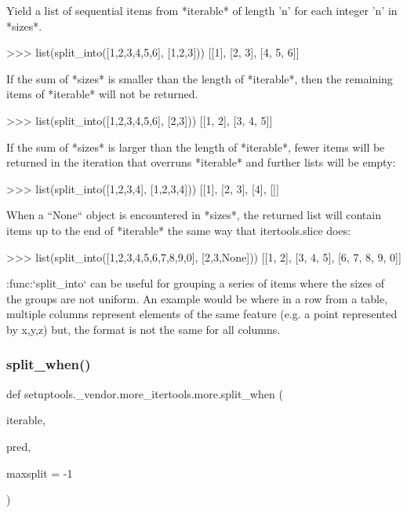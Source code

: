 \begin{DoxyVerb}Yield a list of sequential items from *iterable* of length 'n' for each
integer 'n' in *sizes*.

    >>> list(split_into([1,2,3,4,5,6], [1,2,3]))
    [[1], [2, 3], [4, 5, 6]]

If the sum of *sizes* is smaller than the length of *iterable*, then the
remaining items of *iterable* will not be returned.

    >>> list(split_into([1,2,3,4,5,6], [2,3]))
    [[1, 2], [3, 4, 5]]

If the sum of *sizes* is larger than the length of *iterable*, fewer items
will be returned in the iteration that overruns *iterable* and further
lists will be empty:

    >>> list(split_into([1,2,3,4], [1,2,3,4]))
    [[1], [2, 3], [4], []]

When a ``None`` object is encountered in *sizes*, the returned list will
contain items up to the end of *iterable* the same way that itertools.slice
does:

    >>> list(split_into([1,2,3,4,5,6,7,8,9,0], [2,3,None]))
    [[1, 2], [3, 4, 5], [6, 7, 8, 9, 0]]

:func:`split_into` can be useful for grouping a series of items where the
sizes of the groups are not uniform. An example would be where in a row
from a table, multiple columns represent elements of the same feature
(e.g. a point represented by x,y,z) but, the format is not the same for
all columns.
\end{DoxyVerb}
 \mbox{\label{namespacesetuptools_1_1__vendor_1_1more__itertools_1_1more_ae26b0d8a7973334ba9a01860d90dc031}} 
\subsubsection{\texorpdfstring{split\+\_\+when()}{split\_when()}}
{\footnotesize\ttfamily def setuptools.\+\_\+vendor.\+more\+\_\+itertools.\+more.\+split\+\_\+when (\begin{DoxyParamCaption}\item[{}]{iterable,  }\item[{}]{pred,  }\item[{}]{maxsplit = {\ttfamily -\/1} }\end{DoxyParamCaption})}

